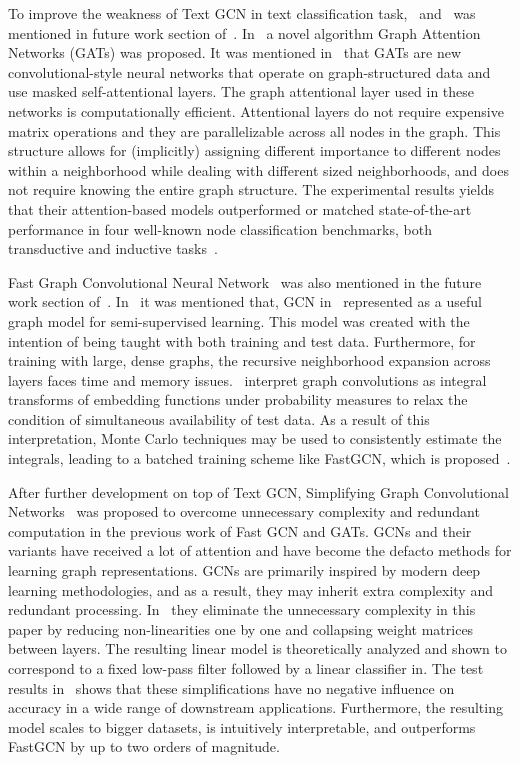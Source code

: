 To improve the weakness of Text GCN in text classification task,~\autocite{velickovic18graph} and~\autocite{fastGCN2018} was mentioned in future work section of~\autocite{yao18graph}. In~\autocite{velickovic18graph} a novel algorithm Graph Attention Networks (GATs) was proposed. It was mentioned in~\autocite{velickovic18graph} that GATs are new convolutional-style neural networks that operate on graph-structured data and use masked self-attentional layers. The graph attentional layer used in these networks is computationally efficient. Attentional layers do not require expensive matrix operations and they are parallelizable across all nodes in the graph. This structure allows for (implicitly) assigning different importance to different nodes within a neighborhood while dealing with different sized neighborhoods, and does not require knowing the entire graph structure. The experimental results yields that their attention-based models outperformed or matched state-of-the-art performance in four well-known node classification benchmarks, both transductive and inductive tasks~\autocite{velickovic18graph}.

Fast Graph Convolutional Neural Network~\autocite{fastGCN2018} was also mentioned in the future work section of~\autocite{yao18graph}. In~\autocite{fastGCN2018} it was mentioned that, GCN in~\autocite{kipf17semisupervised} represented as a useful graph model for semi-supervised learning. This model was created with the intention of being taught with both training and test data. Furthermore, for training with large, dense graphs, the recursive neighborhood expansion across layers faces time and memory issues.~\autocite{fastGCN2018} interpret graph convolutions as integral transforms of embedding functions under probability measures to relax the condition of simultaneous availability of test data. As a result of this interpretation, Monte Carlo techniques may be used to consistently estimate the integrals, leading to a batched training scheme like FastGCN, which is proposed~\autocite{fastGCN2018}.

After further development on top of Text GCN, Simplifying Graph Convolutional Networks~\autocite{simplfyingGCN2019} was proposed to overcome unnecessary complexity and redundant computation in the previous work of Fast GCN and GATs. GCNs and their variants have received a lot of attention and have become the defacto methods for learning graph representations. GCNs are primarily inspired by modern deep learning methodologies, and as a result, they may inherit extra complexity and redundant processing. In~\autocite{simplfyingGCN2019} they eliminate the unnecessary complexity in this paper by reducing non-linearities one by one and collapsing weight matrices between layers. The resulting linear model is theoretically analyzed and shown to correspond to a fixed low-pass filter followed by a linear classifier in. The test results in~\autocite{simplfyingGCN2019} shows that these simplifications have no negative influence on accuracy in a wide range of downstream applications. Furthermore, the resulting model scales to bigger datasets, is intuitively interpretable, and outperforms FastGCN by up to two orders of magnitude.

